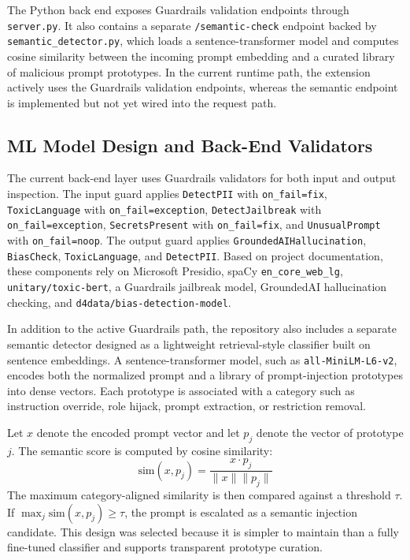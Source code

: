 \documentclass[journal]{IEEEtran}
\begin{document}
The Python back end exposes Guardrails validation endpoints through \texttt{server.py}. It also contains a separate \texttt{/semantic-check} endpoint backed by \texttt{semantic\_detector.py}, which loads a sentence-transformer model and computes cosine similarity between the incoming prompt embedding and a curated library of malicious prompt prototypes. In the current runtime path, the extension actively uses the Guardrails validation endpoints, whereas the semantic endpoint is implemented but not yet wired into the request path.

\subsection{ML Model Design and Back-End Validators}
The current back-end layer uses Guardrails validators for both input and output inspection. The input guard applies \texttt{DetectPII} with \texttt{on\_fail=fix}, \texttt{ToxicLanguage} with \texttt{on\_fail=exception}, \texttt{DetectJailbreak} with \texttt{on\_fail=exception}, \texttt{SecretsPresent} with \texttt{on\_fail=fix}, and \texttt{UnusualPrompt} with \texttt{on\_fail=noop}. The output guard applies \texttt{GroundedAIHallucination}, \texttt{BiasCheck}, \texttt{ToxicLanguage}, and \texttt{DetectPII}. Based on project documentation, these components rely on Microsoft Presidio, spaCy \texttt{en\_core\_web\_lg}, \texttt{unitary/toxic-bert}, a Guardrails jailbreak model, GroundedAI hallucination checking, and \texttt{d4data/bias-detection-model}.

In addition to the active Guardrails path, the repository also includes a separate semantic detector designed as a lightweight retrieval-style classifier built on sentence embeddings. A sentence-transformer model, such as \texttt{all-MiniLM-L6-v2}, encodes both the normalized prompt and a library of prompt-injection prototypes into dense vectors. Each prototype is associated with a category such as instruction override, role hijack, prompt extraction, or restriction removal.

Let $x$ denote the encoded prompt vector and let $p_j$ denote the vector of prototype $j$. The semantic score is computed by cosine similarity:
\begin{equation}
\mathrm{sim}(x,p_j)=\frac{x \cdot p_j}{\|x\|\|p_j\|}
\end{equation}
The maximum category-aligned similarity is then compared against a threshold $\tau$. If $\max_j \mathrm{sim}(x,p_j) \geq \tau$, the prompt is escalated as a semantic injection candidate. This design was selected because it is simpler to maintain than a fully fine-tuned classifier and supports transparent prototype curation.
\end{document}
